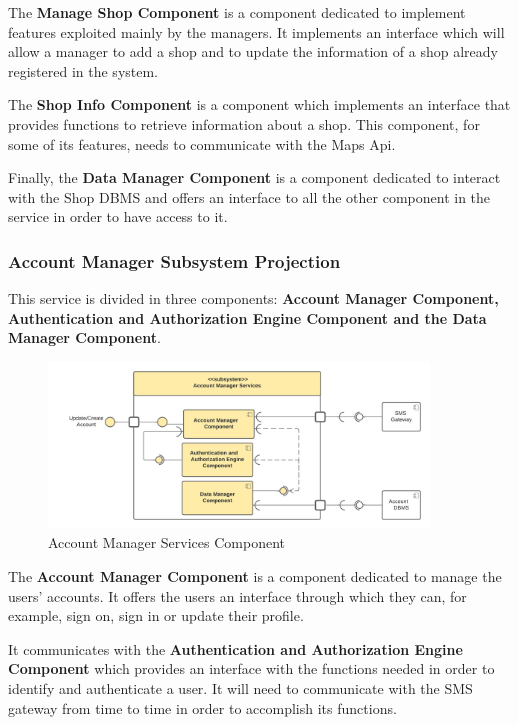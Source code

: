 \FloatBarrier

The \textbf{Manage Shop Component} is a component dedicated to implement features exploited mainly by the managers. It implements an interface which will allow a manager to add a shop and to update the information of a shop already registered in the system.

The \textbf{Shop Info Component} is a component which implements an interface that provides functions to retrieve information about a shop. This component, for some of its features, needs to communicate with the Maps Api.

Finally, the \textbf{Data Manager Component} is a component dedicated to interact with the Shop DBMS and offers an interface to all the other component in the service in order to have access to it.

\subsubsection{Account Manager Subsystem Projection}
\label{subsubsect:accountmanagerservice}

This service is divided in three components: \textbf{Account Manager Component, Authentication and Authorization Engine Component and the Data Manager Component}.

\begin{figure}[h!]
    \centering
    \includegraphics[width=0.9\textwidth]{Images/AccountManagerServices.png}
    \caption{\label{fig:ComponentViewAccountManagerServices}{Account Manager Services Component}}
\end{figure}

\FloatBarrier

The \textbf{Account Manager Component} is a component dedicated to manage the users' accounts. It offers the users an interface through which they can, for example, sign on, sign in or update their profile. 

It communicates with the \textbf{Authentication and Authorization Engine Component} which provides an interface with the functions needed in order to identify and authenticate a user. It will need to communicate with the SMS gateway from time to time in order to accomplish its functions.

